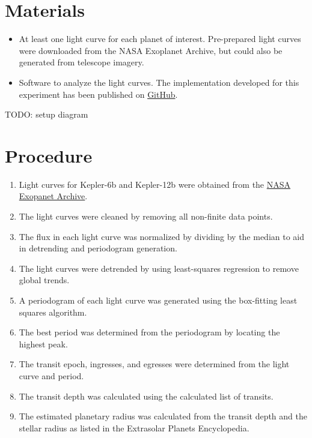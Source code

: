 \section{Materials}

\begin{itemize}
    \item At least one light curve for each planet of interest. Pre-prepared light curves were downloaded from the NASA Exoplanet Archive, but could
        also be generated from telescope imagery. \autocite{exoplanetArchive}
    \item Software to analyze the light curves. The implementation developed for this experiment has been published on \href{https://github.com/roguePanda/exoplanet-project}{GitHub}.
\end{itemize}

TODO: setup diagram

\section{Procedure}

\begin{enumerate}
    \item Light curves for Kepler-6b and Kepler-12b were obtained from the \href{http://exoplanetarchive.ipac.caltech.edu/}{NASA Exopanet Archive}.
    \item The light curves were cleaned by removing all non-finite data points.
    \item The flux in each light curve was normalized by dividing by the median to aid in detrending and periodogram generation.
    \item The light curves were detrended by using least-squares regression to remove global trends. \autocite{untrendy}
    \item A periodogram of each light curve was generated using the box-fitting least squares algorithm. \autocite{bls, pythonBls}
    \item The best period was determined from the periodogram by locating the highest peak.
    \item The transit epoch, ingresses, and egresses were determined from the light curve and period.
    \item The transit depth was calculated using the calculated list of transits.
    \item The estimated planetary radius was calculated from the transit depth and the stellar radius as listed in the Extrasolar Planets Encyclopedia. \autocite{exoplanetEncyclopedia}
\end{enumerate}

